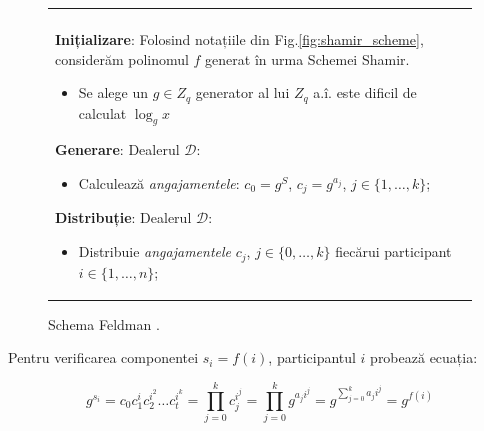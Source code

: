 \documentclass[oneside, 12pt]{book}
\begin{document}
\begin{figure}[h!]

\begin{tabular}{|p{\textwidth}|}
\hline

\\
\hspace{.1in}
\textbf{Inițializare}: 
	Folosind notațiile din Fig.\ref{fig:shamir_scheme}, considerăm polinomul $f$ generat în urma Schemei Shamir.
	\begin{itemize}
		\item Se alege un $g \in Z_q$ generator al lui $Z_q$ a.î. este dificil de calculat $\log_g x$
	\end{itemize}
\medskip

\hspace{.1in}
\textbf{Generare}: Dealerul $\mathcal{D}$:
	\begin{itemize}
		\item Calculează \textit{angajamentele}: $c_0 = g^S$, $c_j = g^{a_j}$, $j \in \{1,\dots,k\}$;
	\end{itemize}
\medskip

\hspace{.1in}
\textbf{Distribuție}: Dealerul $\mathcal{D}$:
	\begin{itemize}
		\item Distribuie \textit{angajamentele} $c_j$, $j \in \{0,\dots,k\}$ fiecărui participant $i\in \{1,\dots,n\}$;
	\end{itemize}

\hspace{.1in}
\\
\hline
\end{tabular}

\caption{Schema Feldman \cite{Feldman:1987}.}
\label{fig:feldman_scheme}
\end{figure}

Pentru verificarea componentei $s_i = f(i)$, participantul $i$ probează ecuația:

\begin{equation}
	g^{s_i} = c_0c_1^ic_2^{i^2} \dots c_t^{i^k} = \prod_{j=0}^k c_j^{i^j} = \prod_{j=0}^k g^{a_ji^j} = g^{\sum\limits_{j=0}^k a_ji^j} = g^{f(i)}
\end{equation}
\end{document}
